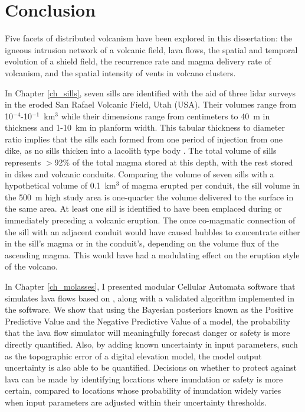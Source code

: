 \chapter[Conclusion]{Conclusion}

Five facets of distributed volcanism have been explored in this dissertation: the igneous intrusion network of a volcanic field, lava flows, the spatial and temporal evolution of a shield field, the recurrence rate and magma delivery rate of volcanism, and the spatial intensity of vents in volcano clusters. 

In Chapter \ref{ch_sills}, seven sills are identified with the aid of three lidar surveys in the eroded San Rafael Volcanic Field, Utah (USA). Their volumes range from 10$^{-4}$-10$^{-1}$~km$^3$ while their dimensions range from centimeters to 40~m in thickness and 1-10~km in planform width. This tabular thickness to diameter ratio implies that the sills each formed from one period of injection from one dike, as no sills thicken into a lacolith type body \citep{gudmundsson2012magma}. The total volume of sills represents $>$92\% of the total magma stored at this depth, with the rest stored in dikes and volcanic conduits. Comparing the volume of seven sills with a hypothetical volume of 0.1~km$^3$ of magma erupted per conduit, the sill volume in the 500~m high study area is one-quarter the volume delivered to the surface in the same area. At least one sill is identified to have been emplaced during or immediately preceding a volcanic eruption. The once co-magmatic connection of the sill with an adjacent conduit would have caused bubbles to concentrate either in the sill's magma or in the conduit's, depending on the volume flux of the ascending magma. This would have had a modulating effect on the eruption style of the volcano.

In Chapter \ref{ch_molasses}, I presented modular Cellular Automata software that simulates lava flows based on \citet{connor2012probabilistic}, along with a validated algorithm implemented in the software. We show that using the Bayesian posteriors known as the Positive Predictive Value and the Negative Predictive Value of a model, the probability that the lava flow simulator will meaningfully forecast danger or safety is more directly quantified. Also, by adding known uncertainty in input parameters, such as the topographic error of a digital elevation model, the model output uncertainty is also able to be quantified. Decisions on whether to protect against lava can be made by identifying locations where inundation or safety is more certain, compared to locations whose probability of inundation widely varies when input parameters are adjusted within their uncertainty thresholds.

